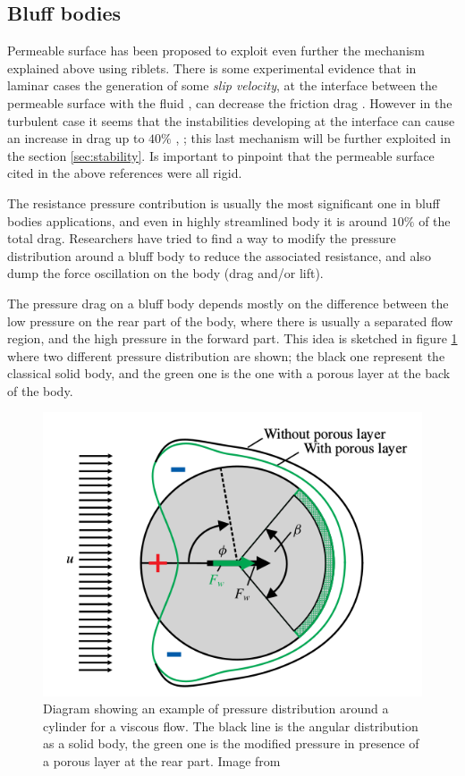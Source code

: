 \subsection{Bluff bodies}

Permeable surface has been proposed to exploit even further the mechanism explained above using riblets.
There is some experimental evidence that in laminar cases the generation of some \textit{slip velocity}, at the interface between the permeable surface with the fluid , can decrease the friction drag \citet{beavers1967boundary}.
However in the turbulent case it seems that the instabilities developing at the interface can cause an increase in drag up to $40\%$ \citet{jimenez2001turbulent}, \citet{breugem2006influence}; this last mechanism will be further exploited in the section \ref{sec:stability}.
Is important to pinpoint that the permeable surface cited in the above references were all rigid.

The resistance pressure contribution is usually the most significant one in bluff bodies applications, and even in highly streamlined body it is around $10\%$ of the total drag.
Researchers have tried to find a way to modify the pressure distribution around a bluff body to reduce the associated resistance, and also dump the force oscillation on the body (drag and/or lift).

The pressure drag on a bluff body depends mostly on the difference between the low pressure on the rear part of the body, where there is usually a separated flow region, and the high pressure in the forward part.
This idea is sketched in figure \ref{fig:pressure_dist} where two different pressure distribution are shown; the black one represent the classical solid body, and the green one is the one with a porous layer at the back of the body.

\begin{figure}[h]
	\centering
	\includegraphics[width=0.4\linewidth]{chapter_1/pressure_dist}
	\caption{Diagram showing an example of pressure distribution around a cylinder for a viscous flow. The black line is the angular distribution as a solid body, the green one is the modified pressure in presence of a porous layer at the rear part. Image from \citet{klausmann2017drag}}
	\label{fig:pressure_dist}
\end{figure}

